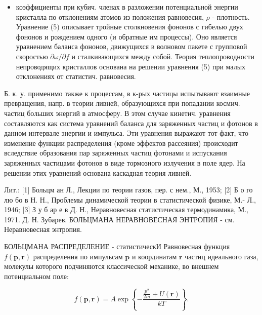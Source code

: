 \documentclass[10pt]{article}
\begin{document}
\begin{itemize}

  \item коэффициенты при кубич. членах в разложении потенциальной энергии кристалла по отклонениям атомов из положения равновесия, $\rho$ - плотность. Уравнение (5) описывает тройные столкновения фононов с гибелью двух фононов и рождением одного (и обратные им процессы). Оно является уравнением баланса фононов, движущихся в волновом пакете с групповой скоростью $\partial \omega / \partial f$ и сталкивающихся между собой. Теория теплопроводности непроводящих кристаллов основана на решении уравнения (5) при малых отклонениях от статистич. равновесия.

\end{itemize}



Б. к. у. применимо также к процессам, в к-рых частицы испытывают взаимные превращения, напр. в теории ливней, образующихся при попадании космич. частиц больших энергий в атмосферу. В этом случае кинетич. уравнения составляются как система уравнений баланса для заряженных частиц и фотонов в данном интервале энергии и импульса. Эти уравнения выражают тот факт, что изменение функции распределения (кроме эффектов рассеяния) происходит вследствие образования пар заряженных частиц фотонами и испускания заряженных частицами фотонов в виде тормозного излучения в поле ядер. На решении этих уравнений основана каскадная теория ливней.



Лит.: [1] Больцм ан Л., Лекции по теории газов, пер. с нем., М., 1953; [2] Б о го лю бо в Н. Н., Проблемы динамической теории в статистической физике, М.- Л., 1946; [3] З у б ар е в Д. Н., Неравновесная статистическая термодинамика, М., 1971. Д. Н. Зубарев. БОЛЬЦМАНА НЕРАВНОВЕСНАЯ ЭНТРОПИЯ - см. Неравновесная энтропия.



БОЛЬЦМАНА РАСПРЕДЕЛЕНИЕ - статистическИ Равновесная функция $f(\boldsymbol{p}, \boldsymbol{r})$ распределения по импульсам $\boldsymbol{p}$ и координатам $\boldsymbol{r}$ частиц идеального газа, молекулы которого подчиняются классической механике, во внешнем потенциальном поле:



\[

f(\boldsymbol{p}, \boldsymbol{r})=A \exp \left\{-\frac{\frac{p^{2}}{2 m}+U(\boldsymbol{r})}{k T}\right\} .

\]
\end{document}

